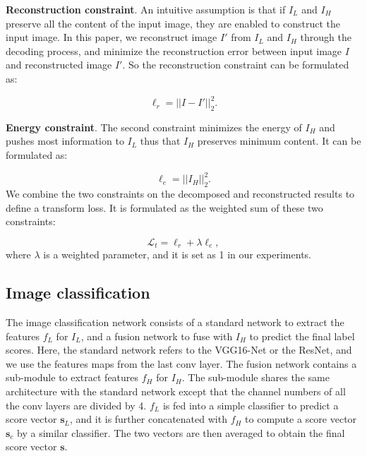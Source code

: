 \documentclass[letterpaper]{article} %
\begin{document}
\noindent\textbf{Reconstruction constraint}. 
An intuitive assumption is that if $I_L$ and $I_H$ preserve all the content of the input image, they are enabled to construct the input image. In this paper, we reconstruct image $I'$ from $I_L$ and $I_H$ through the decoding process, and minimize the reconstruction error between input image $I$ and reconstructed image $I'$. So the reconstruction constraint can be formulated as:

\begin{equation} 
   \ell_r=\vert\vert I-I' \vert\vert_2^2.
\end{equation}

\noindent\textbf{Energy constraint}. 
The second constraint minimizes the energy of $I_H$ and pushes most information to $I_L$ thus that $I_H$ preserves minimum content. It can be formulated as: 

\begin{equation} 
   \ell_e=\vert\vert I_H \vert\vert_2^2.
\end{equation}
We combine the two constraints on the decomposed and reconstructed results to define a transform loss. It is formulated as the weighted sum of these two constraints:

\begin{equation} 
   \mathcal{L}_t=\ell_r+\lambda\ell_e,
\end{equation}
where $\lambda$ is a weighted parameter, and it is set as 1 in our experiments.

\subsection{Image classification}
The image classification network consists of a standard network to extract the features $f_L$ for $I_L$, and a fusion network to fuse with $I_H$ to predict the final label scores. Here, the standard network refers to the VGG16-Net or the ResNet, and we use the features maps from the last conv layer. The fusion network contains a sub-module to extract features $f_H$ for $I_H$. The sub-module shares the same architecture with the standard network except that the channel numbers of all the conv layers are divided by 4. $f_L$ is fed into a simple classifier to predict a score vector $\mathbf{s}_L$, and it is further concatenated with $f_H$ to compute a score vector $\mathbf{s}_c$ by a similar classifier. The two vectors are then averaged to obtain the final score vector $\mathbf{s}$.
\end{document}
